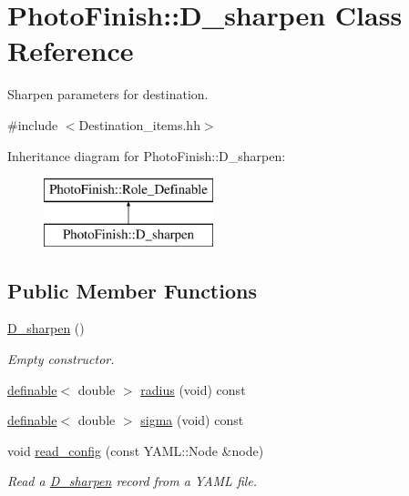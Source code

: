\hypertarget{class_photo_finish_1_1_d__sharpen}{}\section{Photo\+Finish\+:\+:D\+\_\+sharpen Class Reference}
\label{class_photo_finish_1_1_d__sharpen}


Sharpen parameters for destination.  




{\ttfamily \#include $<$Destination\+\_\+items.\+hh$>$}

Inheritance diagram for Photo\+Finish\+:\+:D\+\_\+sharpen\+:\begin{figure}[H]
\begin{center}
\leavevmode
\includegraphics[height=2.000000cm]{class_photo_finish_1_1_d__sharpen}
\end{center}
\end{figure}
\subsection*{Public Member Functions}
\begin{DoxyCompactItemize}
\item 
\hyperlink{class_photo_finish_1_1_d__sharpen_a2b51c49b0deff669e873d4871173fa45}{D\+\_\+sharpen} ()
\begin{DoxyCompactList}\small\item\em Empty constructor. \end{DoxyCompactList}\item 
\hyperlink{class_photo_finish_1_1definable}{definable}$<$ double $>$ \hyperlink{class_photo_finish_1_1_d__sharpen_a0eff26c87d91068950042b810bd45144}{radius} (void) const
\item 
\hyperlink{class_photo_finish_1_1definable}{definable}$<$ double $>$ \hyperlink{class_photo_finish_1_1_d__sharpen_a71a1ab086c5818f51e9d501ab6f086a5}{sigma} (void) const
\item 
void \hyperlink{class_photo_finish_1_1_d__sharpen_a625cbe961ba438104d80d18779abc964}{read\+\_\+config} (const Y\+A\+M\+L\+::\+Node \&node)
\begin{DoxyCompactList}\small\item\em Read a \hyperlink{class_photo_finish_1_1_d__sharpen}{D\+\_\+sharpen} record from a Y\+A\+ML file. \end{DoxyCompactList}\end{DoxyCompactItemize}
